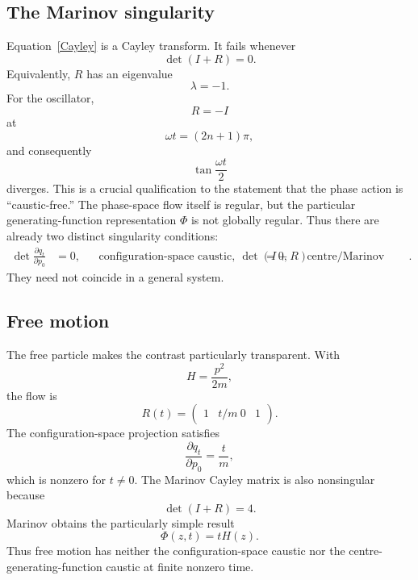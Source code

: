 \subsection{The Marinov singularity}
Equation~\eqref{Cayley} is a Cayley transform.  It fails whenever
\begin{equation}
\det(I+R)=0.
\label{centrecaustic}
\end{equation}
Equivalently, \(R\) has an eigenvalue
\begin{equation}
\lambda=-1.
\end{equation}
For the oscillator,
\begin{equation}
R=-I
\end{equation}
at
\begin{equation}
\omega t=(2n+1)\pi,
\end{equation}
and consequently
\begin{equation}
\tan\frac{\omega t}{2}
\end{equation}
diverges.
This is a crucial qualification to the statement that the phase action is
``caustic-free.''  The phase-space flow itself is regular, but the particular
generating-function representation \(\Phi\) is not globally regular.
Thus there are already two distinct singularity conditions:
\begin{align}
\det\frac{\partial q_t}{\partial p_0}&=0,
&&\text{configuration-space caustic},\
\det(I+R)&=0,
&&\text{centre/Marinov generating-function caustic}.
\end{align}
They need not coincide in a general system.
\subsection{Free motion}
The free particle makes the contrast particularly transparent.  With
\begin{equation}
H=\frac{p^2}{2m},
\end{equation}
the flow is
\begin{equation}
R(t)=
\begin{pmatrix}
1&t/m\
0&1
\end{pmatrix}.
\end{equation}
The configuration-space projection satisfies
\begin{equation}
\frac{\partial q_t}{\partial p_0}=\frac{t}{m},
\end{equation}
which is nonzero for \(t\neq0\).
The Marinov Cayley matrix is also nonsingular because
\begin{equation}
\det(I+R)=4.
\end{equation}
Marinov obtains the particularly simple result
\begin{equation}
\Phi(z,t)=tH(z).
\label{freePhi}
\end{equation}
\cite{Marinov1979}
Thus free motion has neither the configuration-space caustic nor the
centre-generating-function caustic at finite nonzero time.
